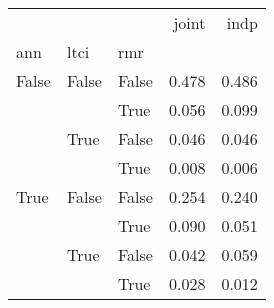 \begin{tabular}{lllrr}
\toprule
     &      &      &  joint &   indp \\
ann & ltci & rmr &        &        \\
\midrule
False & False & False &  0.478 &  0.486 \\
     &      & True &  0.056 &  0.099 \\
     & True & False &  0.046 &  0.046 \\
     &      & True &  0.008 &  0.006 \\
True & False & False &  0.254 &  0.240 \\
     &      & True &  0.090 &  0.051 \\
     & True & False &  0.042 &  0.059 \\
     &      & True &  0.028 &  0.012 \\
\bottomrule
\end{tabular}
